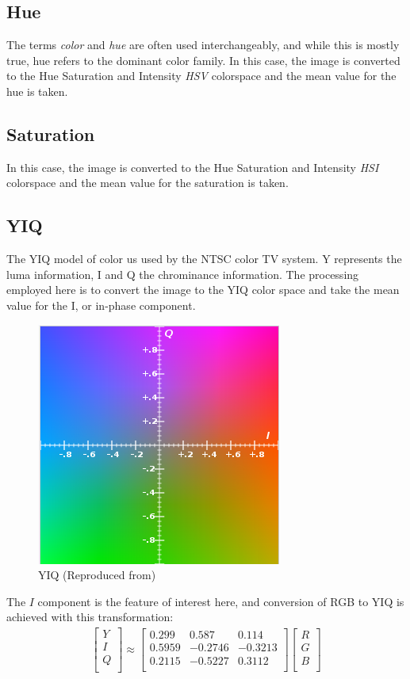 \documentclass[letterpaper]{article}
\begin{document}
{%
\subsection{Hue}
The terms {\it color} and {\it hue} are often used interchangeably, and while this is mostly true, hue refers to the dominant color family. In this case, the image is converted to the Hue Saturation and Intensity {\it HSV} colorspace and the mean value for the hue is taken.

\subsection{Saturation}
In this case, the image is converted to the Hue Saturation and Intensity {\it HSI} colorspace and the mean value for the saturation is taken. \cite{Various_undated-yv}

\subsection{YIQ}
The YIQ model of color us used by the NTSC color TV system. Y represents the luma information, I and Q the chrominance information. The processing employed here is to convert the image to the YIQ color space and take the mean value for the I, or in-phase component.
\begin{figure}[h!]
	\centering
	\includegraphics[width=0.4\linewidth]{./figures/yiq.png}
	\caption{YIQ (Reproduced from\protect\cite{Various_undated-cz})}
	\label{fig:yiq}
\end{figure}
The $I$ component is the feature of interest here, and conversion of RGB to YIQ is achieved with this transformation:
\begin{eqnarray*}
	\begin{bmatrix}
	Y \\[0.3em]
	I \\[0.3em]
	Q \\[0.3em]
	\end{bmatrix}
	\approx
	\begin{bmatrix}
	0.299 & 0.587 & 0.114 \\[0.3em]
	0.5959 & -0.2746 & -0.3213\\[0.3em]
	0.2115 & -0.5227 & 0.3112 \\[0.3em]
	\end{bmatrix}
	\begin{bmatrix}
	R \\[0.3em]
	G \\[0.3em]
	B \\[0.3em]
	\end{bmatrix}	
\end{eqnarray*}

}
\end{document}
